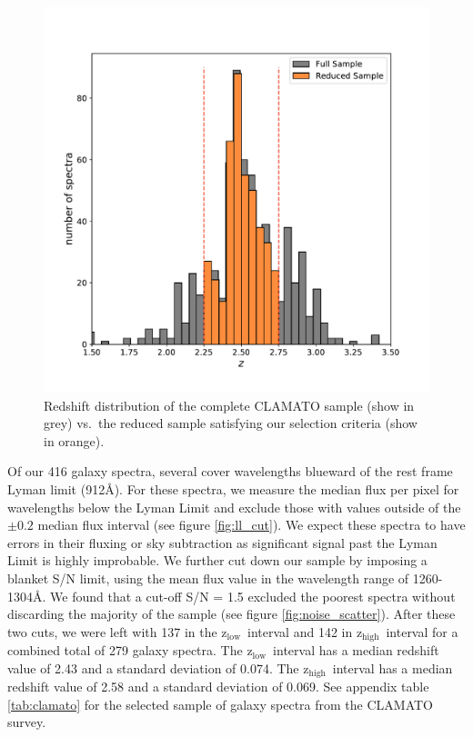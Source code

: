 \documentclass[twocolumn,tight,times]{aastex63}
\newcommand{\hiz}{$\mathrm{z_{high}}$}
\newcommand{\loz}{$\mathrm{z_{low}}$}
\begin{document}
\begin{figure}[ht]
    \begin{center}
    \includegraphics[width=\columnwidth]{red_hist.pdf}
    \caption{Redshift distribution of the complete CLAMATO sample (show in grey) vs.\ the reduced sample satisfying our selection criteria (show in orange).}
    \label{fig:clamatohist}
    \end{center}
\end{figure}

Of our 416 galaxy spectra, several cover wavelengths blueward of the rest frame Lyman limit (912\AA). For these spectra, we measure the median flux per pixel for wavelengths below the Lyman Limit and exclude those with values outside of the $\pm 0.2$ median flux interval (see figure \ref{fig:ll_cut}). We expect these spectra to have errors in their fluxing or sky subtraction as significant signal past the Lyman Limit is highly improbable. We further cut down our sample by imposing a blanket S/N limit, using the mean flux value in the wavelength range of 1260-1304\AA. We found that a cut-off S/N = 1.5 excluded the poorest spectra without discarding the majority of the sample (see figure \ref{fig:noise_scatter}). After these two cuts, we were left with 137 in the \loz\ interval and 142 in \hiz\ interval for a combined total of 279 galaxy spectra. The \loz\ interval has a median redshift value of 2.43 and a standard deviation of 0.074. The \hiz\ interval has a median redshift value of 2.58 and a standard deviation of 0.069. See appendix table \ref{tab:clamato} for the selected sample of galaxy spectra from the CLAMATO survey.
\end{document}
